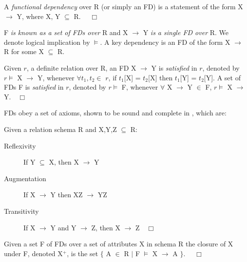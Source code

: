 \begin{definition}
\begin{rm}
A {\em functional dependency} over R (or simply an FD)
is a statement of the form X $\to$ Y, where X, Y $\subseteq$ R. $\quad\Box$
\end{rm}
\end{definition}
\medskip
 
 F {\em is known as a set of FDs over} R and X $\to$ Y 
{\em is  a single FD over} R. We denote logical implication by $\models$.
A key dependency is an FD of the form X $\to$ R for some X $\subseteq$
R. 
\begin{definition}[Satisfaction of an FD]\label{def:sat}
\begin{rm}
Given $r$,  a definite relation over R,
an FD X $\to$ Y is {\em satisfied} in $r$,
denoted by $r \models$ X $\to$ Y, whenever
$\forall t_1, t_2 \in$ $r$, if $t_1$[X] = $t_2$[X] then $t_1$[Y] = $t_2$[Y].
A set of FDs F is {\em satisfied} in $r$,
denoted by $r \models$ F, whenever
$\forall$ X $\to$ Y $\in$ F, $r \models$ X $\to$ Y.$\quad\Box$
\end{rm}
\end{definition}
\medskip
{}
FDs obey a set of axioms, shown to be sound and complete in
\cite{Arms74}, which are:
\begin{definition}
\begin{rm}
Given a relation schema R and X,Y,Z $\subseteq$ R:
{\line
\begin{description}
\item[Reflexivity] If Y $\subseteq$ X, then X $\to$ Y
\item[Augmentation] If X $\to$ Y then XZ $\to$ YZ
\item[Transitivity] If X $\to$ Y and Y $\to$ Z, then X $\to$ Z$\quad\Box$
\end{description}
}
\end{rm}
\end{definition}



\begin{definition}
\begin{rm}
Given a set F of FDs over a set of attributes X in schema R the closure of X
under F, denoted X$^+$, is the set $\{$ A $\in$ R $\mid$ F $\models$ X
$\to$ A $\}$. $\quad\Box$
\end{rm}
\end{definition}

